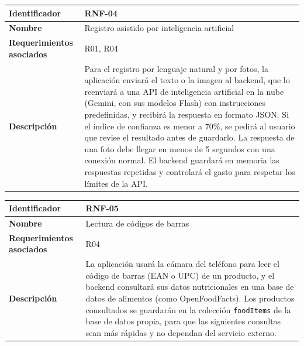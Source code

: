 \begin{table}[h!]
    \centering
    \renewcommand{\arraystretch}{1.3}
    \begin{tabular}{|p{3.5cm}|p{11.5cm}|}
        \hline
        \rowcolor[HTML]{EFEFEF}
        \textbf{Identificador} & \textbf{RNF-04} \\ \hline
        \textbf{Nombre} & Registro asistido por inteligencia artificial \\ \hline
        \textbf{Requerimientos asociados} & R01, R04 \\ \hline
        \textbf{Descripción} & Para el registro por lenguaje natural y por fotos, la aplicación enviará el texto o la imagen al backend, que lo reenviará a una API de inteligencia artificial en la nube (Gemini, con sus modelos Flash) con instrucciones predefinidas, y recibirá la respuesta en formato JSON. Si el índice de confianza es menor a 70\%, se pedirá al usuario que revise el resultado antes de guardarlo. La respuesta de una foto debe llegar en menos de 5 segundos con una conexión normal. El backend guardará en memoria las respuestas repetidas y controlará el gasto para respetar los límites de la API. \\ \hline
    \end{tabular}
\end{table}
\newpage
\begin{table}[h!]
    \centering
    \renewcommand{\arraystretch}{1.3}
    \begin{tabular}{|p{3.5cm}|p{11.5cm}|}
        \hline
        \rowcolor[HTML]{EFEFEF}
        \textbf{Identificador} & \textbf{RNF-05} \\ \hline
        \textbf{Nombre} & Lectura de códigos de barras \\ \hline
        \textbf{Requerimientos asociados} & R04 \\ \hline
        \textbf{Descripción} & La aplicación usará la cámara del teléfono para leer el código de barras (EAN o UPC) de un producto, y el backend consultará sus datos nutricionales en una base de datos de alimentos (como OpenFoodFacts). Los productos consultados se guardarán en la colección \texttt{foodItems} de la base de datos propia, para que las siguientes consultas sean más rápidas y no dependan del servicio externo. \\ \hline
    \end{tabular}
\end{table}
